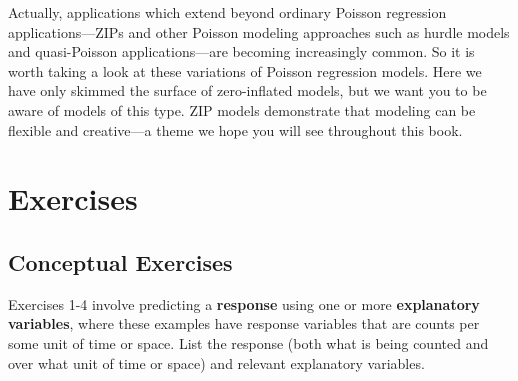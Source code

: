 \documentclass[
]{krantz}
\begin{document}
Actually, applications which extend beyond ordinary Poisson regression applications---ZIPs and other Poisson modeling approaches such as hurdle models and quasi-Poisson applications---are becoming increasingly common. So it is worth taking a look at these variations of Poisson regression models. Here we have only skimmed the surface of zero-inflated models, but we want you to be aware of models of this type. ZIP models demonstrate that modeling can be flexible and creative---a theme we hope you will see throughout this book.

\hypertarget{exercises}{%
\section{Exercises}\label{exercises}}

\hypertarget{exer:concept}{%
\subsection{Conceptual Exercises}\label{exer:concept}}

Exercises 1-4 involve predicting a \textbf{response} using one or more \textbf{explanatory variables}, where these examples have response variables that are counts per some unit of time or space. List the response (both what is being counted and over what unit of time or space) and relevant explanatory variables.
\end{document}

